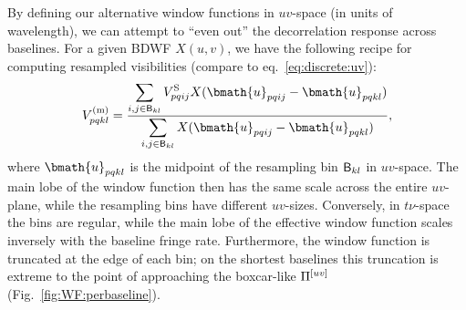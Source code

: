\documentclass[useAMS,usenatbib]{mn2e}
\begin{document}
By defining our alternative window functions in $uv$-space (in units of wavelength), we can attempt to ``even out'' the decorrelation 
response across baselines. For a given BDWF $X(u,v)$, we have the following recipe 
for computing resampled visibilities (compare to eq.~\ref{eq:discrete:uv}):
\begin{equation}
\label{eq:avg:wf}
V^\mathrm{(m)}_{pqkl} = \frac{\displaystyle\sum\limits_{{i,j}\in \Bij_{kl}} \Vs_{pqij} X(\bmath{u}_{pqij}-\bmath{u}_{pqkl})}
{\displaystyle\sum\limits_{{i,j}\in \Bij_{kl}} X(\bmath{u}_{pqij}-\bmath{u}_{pqkl})},
\end{equation}
where $\bmath{u}_{pqkl}$ is the midpoint of the resampling bin $\mathsf{B}_{kl}$ in $uv$-space. The main lobe of the window function then 
has the same scale across the entire $uv$-plane, while the resampling bins have different $uv$-sizes. Conversely, in 
$t\nu$-space the bins
are regular, while the main lobe of the effective window function scales inversely with the baseline fringe rate. Furthermore, 
the window function is truncated at the edge of each bin; on the shortest baselines this truncation is extreme to the 
point of approaching the boxcar-like $\Pi^{[uv]}$ (Fig.~\ref{fig:WF:perbaseline}).
\end{document}
